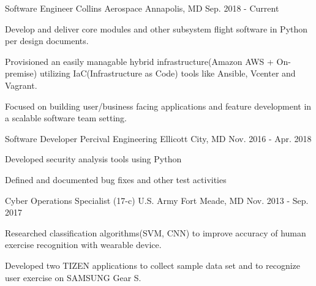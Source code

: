 

\begin{cventries}

  \cventry
    {Software Engineer} %
    {Collins Aerospace} %
    {Annapolis, MD} %
    {Sep. 2018 - Current} %
    {
      \begin{cvitems} %
        \item {Develop and deliver core modules and other subsystem flight software in Python per design documents.}
        \item {Provisioned an easily managable hybrid infrastructure(Amazon AWS + On-premise) utilizing IaC(Infrastructure as Code) tools like Ansible, Vcenter and Vagrant.}
        \item {Focused on building user/business facing applications and feature development in a scalable software team setting.}
      \end{cvitems}
    }

  \cventry
    {Software Developer} %
    {Percival Engineering} %
    {Ellicott City, MD} %
    {Nov. 2016 - Apr. 2018} %
    {
      \begin{cvitems} %
        \item {Developed security analysis tools using Python}
        \item {}
        \item {Defined and documented bug fixes and other test activities}
      \end{cvitems}
    }

  \cventry
    {Cyber Operations Specialist (17-c)} %
    {U.S. Army} %
    {Fort Meade, MD} %
    {Nov. 2013 - Sep. 2017} %
    {
      \begin{cvitems} %
        \item {Researched classification algorithms(SVM, CNN) to improve accuracy of human exercise recognition with wearable device.}
        \item {Developed two TIZEN applications to collect sample data set and to recognize user exercise on SAMSUNG Gear S.}
      \end{cvitems}
    }


\end{cventries}
